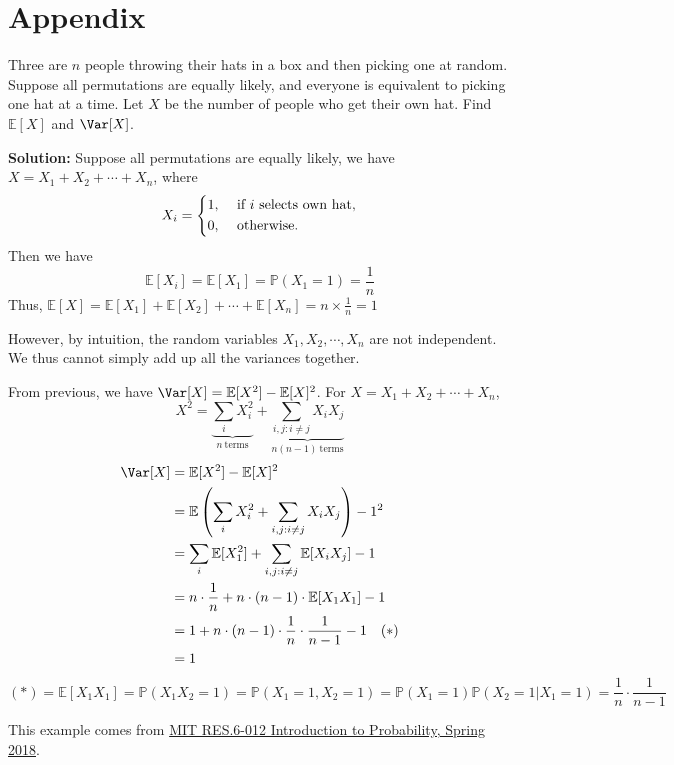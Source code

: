 \section{Appendix}
\begin{eg}
    Three are \(n\) people throwing their hats in a box and then picking one at random. Suppose all permutations are equally likely, and everyone is equivalent to picking one hat at a time. Let \(X\) be the number of people who get their own hat. Find \(\mathbb{E}[X]\) and \(\Var[X]\). 

    \textbf{Solution:}
    Suppose all permutations are equally likely, we have \(X = X_1 + X_2 + \cdots + X_n\), where 
    \[
        X_i = \begin{dcases}
            1, &\text{ if \(i\) selects own hat}  ,\\
            0, &\text{ otherwise} .
        \end{dcases}
    \]
    Then we have 
    \[
        \mathbb{E}[X_i] = \mathbb{E}[X_1] = \mathbb{P}(X_1 = 1) = \frac{1}{n}
    \]
    Thus, \(\mathbb{E}[X] = \mathbb{E}[X_1] + \mathbb{E}[X_2] + \cdots + \mathbb{E}[X_n] = n \times \frac{1}{n} = 1\) 
    
    However, by intuition, the random variables \(X_1, X_2, \cdots, X_n\) are not independent. We thus cannot simply add up all the variances together. 
    
    From previous, we have \(\Var[X] = \mathbb{E}[X^2] - \mathbb{E}[X]^2\). For \(X = X_1 + X_2 + \cdots + X_n\),
    \[
        X^2 = \underbrace{\sum_{i} X_i ^2}_{n\ \text{terms}} + \underbrace{\sum_{i,j:i \neq j} X_i X_j}_{n(n - 1)\ \text{terms}}
    \]
    \[
        \begin{aligned}
            \Var[X] &= \mathbb{E}[X^2] - \mathbb{E}[X]^2 \\
            &= \mathbb{E} \left(\sum_{i} X_i ^2 + \sum_{i,j:i \neq j} X_i X_j\right) - 1^2 \\
            &= \sum_{i} \mathbb{E}[X_1 ^2] + \sum_{i,j:i \neq j} \mathbb{E}[X_i X_j] - 1 \\
            &= n \cdot \frac{1}{n} + n \cdot (n-1) \cdot \mathbb{E}[X_1 X_1] - 1 \\
            &= 1 + n \cdot (n-1) \cdot \frac{1}{n} \cdot \frac{1}{n-1} - 1 \quad(*)\\
            &= 1
        \end{aligned}
    \]
    \[
        (*) = \mathbb{E}[X_1 X_1] = \mathbb{P}(X_1 X_2 = 1) = \mathbb{P}(X_1 = 1, X_2 = 1) = \mathbb{P}(X_1 = 1)\mathbb{P}(X_2 = 1 \vert X_1 = 1) = \frac{1}{n} \cdot \frac{1}{n-1}
    \]

    \begin{remark}
        This example comes from \href{https://ocw.mit.edu/RES-6-012S18}{MIT RES.6-012 Introduction to Probability, Spring 2018}. 
    \end{remark}
\end{eg}

